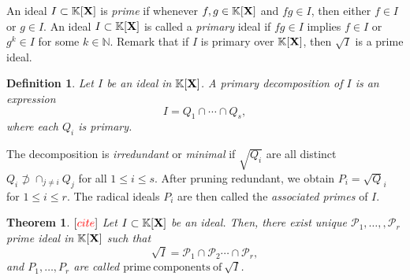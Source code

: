 \documentclass[11pt]{article}
\numberwithin{Property}{section}
\newtheorem{Theorem}{Theorem}%
\numberwithin{Theorem}{section}
\numberwithin{Proposition}{section}
\numberwithin{Lemma}{section}
\numberwithin{Corollary}{section}
\newtheorem{Definition}{Definition}%
\numberwithin{Definition}{section}
\numberwithin{Remark}{section}
\numberwithin{Conjecture}{section}
\numberwithin{Problem}{section}
\numberwithin{Claim}{section}
\theoremstyle{definition}
\numberwithin{Example}{section}
\renewcommand{\leq}{\leqslant}
\newcommand{\field}{\mathbb{K}} %
\newcommand{\mat}[1]{\mathbf{\MakeUppercase{#1}}} %
\newcommand{\todo}[1]{\textcolor{red}{#1}} %
\begin{document}
An ideal $I \subset \field[\mat{X}]$ is \emph{prime} if whenever $f,g \in \field[\mat{X}]$ and $fg \in I$, then either $f \in I$ or $g \in I$. An ideal $I \subset \field[\mat{X}]$ is called a \emph{primary} ideal if $fg \in I$ implies $f \in I$ or $g^k \in I$ for some $k \in \mathbb{N}$. Remark that if $I$ is primary over $\field[\mat{X}]$, then $\sqrt{I}$ is a prime ideal. 
\begin{Definition}
Let $I$ be an ideal in $\field[\mat{X}]$. A \emph{primary decomposition} of $I$ is an expression 
\[
I = Q_1 \cap \cdots \cap Q_s,
\]
where each $Q_i$ is primary.
\end{Definition}
The decomposition is \emph{irredundant} or \emph{minimal} if $\sqrt{Q_i}$ are all distinct $Q_i \not \supset \cap_{j \ne i}Q_j$ for all $1 \leq i \leq s$. After pruning redundant,  we obtain $P_i = \sqrt{Q}_i$ for $1 \leq i \leq r$. The radical ideals $P_i$ are then called the \emph{associated primes} of $I$. 
\begin{Theorem}$[\todo{cite}]$ Let $I \subset \field[\mat{X}]$ be an ideal. Then, there exist unique $\mathcal{P}_1, \ldots,, \mathcal{P}_r$ prime ideal in $\field[\mat{X}]$ such that 
\[
\sqrt{I} = \mathcal{P}_1 \cap \mathcal{P}_2 \cdots \cap \mathcal{P}_r,
\]
and $P_1, \ldots, P_r$ are called $\mathrm{prime \ components \ of} \ \sqrt{I}$. 
\end{Theorem} 
\end{document}
